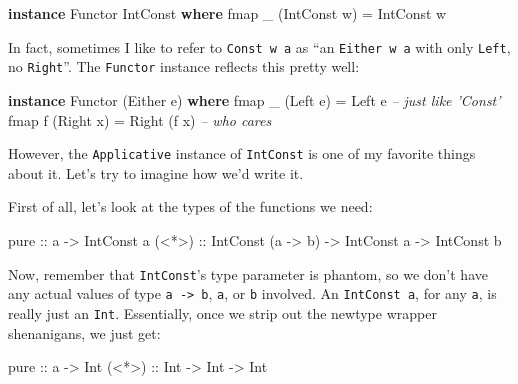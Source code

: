 \documentclass[]{article}
\newenvironment{Shaded}{}{}
\newcommand{\CommentTok}[1]{\textcolor[rgb]{0.38,0.63,0.69}{\textit{#1}}}
\newcommand{\DataTypeTok}[1]{\textcolor[rgb]{0.56,0.13,0.00}{#1}}
\newcommand{\FunctionTok}[1]{\textcolor[rgb]{0.02,0.16,0.49}{#1}}
\newcommand{\KeywordTok}[1]{\textcolor[rgb]{0.00,0.44,0.13}{\textbf{#1}}}
\newcommand{\NormalTok}[1]{#1}
\newcommand{\OtherTok}[1]{\textcolor[rgb]{0.00,0.44,0.13}{#1}}
\begin{document}
\begin{Shaded}
\begin{Highlighting}[]
\KeywordTok{instance} \DataTypeTok{Functor} \DataTypeTok{IntConst} \KeywordTok{where}
\NormalTok{    fmap _ (}\DataTypeTok{IntConst}\NormalTok{ w) }\FunctionTok{=} \DataTypeTok{IntConst}\NormalTok{ w}
\end{Highlighting}
\end{Shaded}

In fact, sometimes I like to refer to \texttt{Const\ w\ a} as ``an
\texttt{Either\ w\ a} with only \texttt{Left}, no \texttt{Right}''. The
\texttt{Functor} instance reflects this pretty well:

\begin{Shaded}
\begin{Highlighting}[]
\KeywordTok{instance} \DataTypeTok{Functor}\NormalTok{ (}\DataTypeTok{Either}\NormalTok{ e) }\KeywordTok{where}
\NormalTok{    fmap _ (}\DataTypeTok{Left}\NormalTok{ e)  }\FunctionTok{=} \DataTypeTok{Left}\NormalTok{ e        }\CommentTok{-- just like 'Const'}
\NormalTok{    fmap f (}\DataTypeTok{Right}\NormalTok{ x) }\FunctionTok{=} \DataTypeTok{Right}\NormalTok{ (f x)   }\CommentTok{-- who cares}
\end{Highlighting}
\end{Shaded}

However, the \texttt{Applicative} instance of \texttt{IntConst} is one of my
favorite things about it. Let's try to imagine how we'd write it.

First of all, let's look at the types of the functions we need:

\begin{Shaded}
\begin{Highlighting}[]
\NormalTok{pure}\OtherTok{  ::}\NormalTok{ a }\OtherTok{->} \DataTypeTok{IntConst}\NormalTok{ a}
\OtherTok{(<*>) ::} \DataTypeTok{IntConst}\NormalTok{ (a }\OtherTok{->}\NormalTok{ b) }\OtherTok{->} \DataTypeTok{IntConst}\NormalTok{ a }\OtherTok{->} \DataTypeTok{IntConst}\NormalTok{ b}
\end{Highlighting}
\end{Shaded}

Now, remember that \texttt{IntConst}'s type parameter is phantom, so we don't
have any actual values of type \texttt{a\ -\textgreater{}\ b}, \texttt{a}, or
\texttt{b} involved. An \texttt{IntConst\ a}, for any \texttt{a}, is really just
an \texttt{Int}. Essentially, once we strip out the newtype wrapper shenanigans,
we just get:

\begin{Shaded}
\begin{Highlighting}[]
\NormalTok{pure}\OtherTok{  ::}\NormalTok{ a }\OtherTok{->} \DataTypeTok{Int}
\OtherTok{(<*>) ::} \DataTypeTok{Int} \OtherTok{->} \DataTypeTok{Int} \OtherTok{->} \DataTypeTok{Int}
\end{Highlighting}
\end{Shaded}
\end{document}
